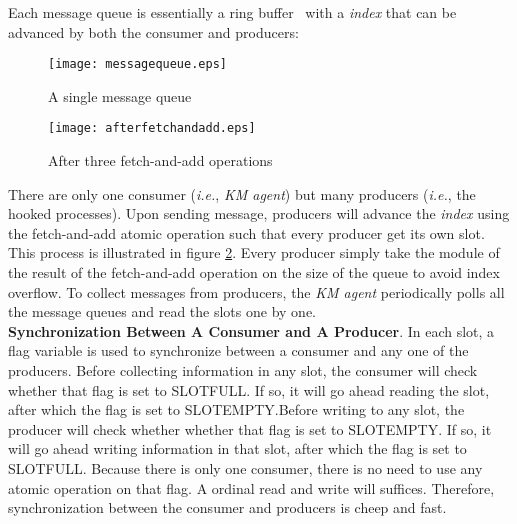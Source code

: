 \documentclass[letterpaper,twocolumn,10pt]{article}
\begin{document}
Each message queue is essentially a ring buffer~\cite{ringbuffer} with a
\textit{index} that can be advanced by both the consumer and producers: 

\begin{subfigures}
    \begin{figure}[H]
    \centering
    \texttt{[image: messagequeue.eps]}
    \caption{\label{fig:singlemq}A single message queue}
\end{figure}
    \begin{figure}[H]
    \centering
    \texttt{[image: afterfetchandadd.eps]}
    \caption{\label{fig:afterfa}After three fetch-and-add operations}
\end{figure}
\end{subfigures}

\noindent
There are only one consumer (\textit{i.e.}, \textit{KM agent}) but many
producers (\textit{i.e.}, the hooked processes). Upon sending message,
producers will advance the \textit{index} using the fetch-and-add atomic
operation such that every producer get its own slot. This process is
illustrated in figure \ref{fig:afterfa}. Every producer simply take the
module of the result of the fetch-and-add operation on the size of the queue
to avoid index overflow. To collect messages from producers, the \textit{KM
agent} periodically polls all the message queues and read the slots one by
one.\\ 

\noindent
\textbf{Synchronization Between A Consumer and A Producer}. In each slot, a
flag variable is used to synchronize between a consumer and any one of the
producers. Before collecting information in any slot, the consumer will check
whether that flag is set to SLOTFULL. If so, it will go ahead reading the
slot, after which the flag is set to SLOTEMPTY.Before writing to any slot,
the producer will check whether whether that flag is set to SLOTEMPTY. If so,
it will go ahead writing information in that slot, after which the flag is
set to SLOTFULL. Because there is only one consumer, there is no need to use
any atomic operation on that flag. A ordinal read and write will suffices.
Therefore, synchronization between the consumer and producers is cheep and
fast.\\
\end{document}
